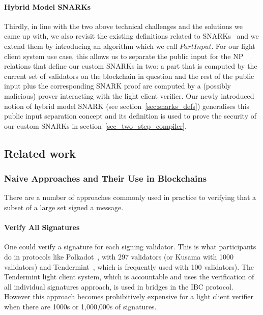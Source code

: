 \paragraph{Hybrid Model SNARKs} Thirdly, in line with the two above technical challenges and the solutions we came up with, we also revisit the existing definitions 
related to SNARKs~\cite{groth16, plonk} and we extend them by introducing an algorithm which we call $\mathit{PartInput}$. For 
our light client system use case, this allows us to separate the public input for the NP relations that define our custom SNARKs in two: a part 
that is computed by the current set of validators on the blockchain in question and the rest of the public input plus the corresponding SNARK proof are 
computed by a (possibly malicious) prover interacting with the light client verifier. Our newly introduced notion of hybrid model SNARK (see section~\ref{sec:snarks_defs}) 
generalises this public input separation concept and its definition is used to prove the security of our custom 
SNARKs in section~\ref{sec_two_step_compiler}.

\subsection{Related work}

\subsubsection{Naive Approaches and Their Use in Blockchains}

There are a number of approaches commonly used in practice to verifying that a subset of a large set signed a message. 

\paragraph{Verify All Signatures}  One could verify a signature for each signing validator. This is what participants  do in protocols like Polkadot~\cite{polkadot}, with 297 validators
(or Kusama with 1000 validators) %
and Tendermint~\cite{tendermint1, tendermint_paper}, which is frequently used with 100 validators). %
The Tendermint light client system, which is accountable and uses the verification of all individual signatures approach, 
is used in bridges in the IBC protocol\cite{IBC_paper}. However this approach becomes prohibitively expensive for a light client verifier when there are 1000s or 1,000,000s of signatures. 

